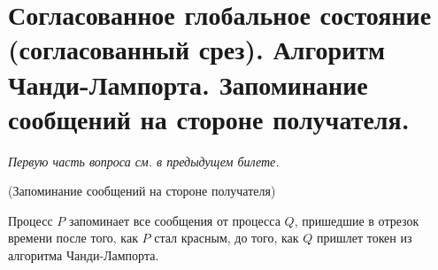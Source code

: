 \section{Согласованное глобальное состояние (согласованный срез).
Алгоритм Чанди-Лампорта. Запоминание сообщений на стороне получателя.}

\textit{Первую часть вопроса см. в предыдущем билете.}

\begin{algorithm}(Запоминание сообщений на стороне получателя)

    Процесс $P$ запоминает все сообщения от процесса $Q$,
    пришедшие в отрезок времени после того, как $P$ стал красным, 
    до того, как $Q$ пришлет токен из алгоритма Чанди-Лампорта.
\end{algorithm}

